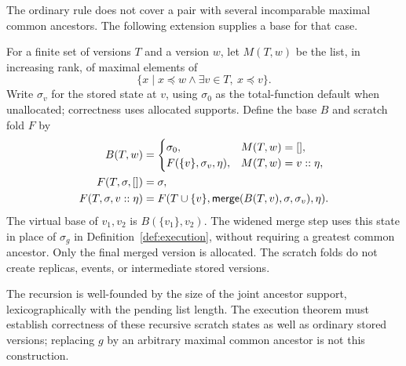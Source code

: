The ordinary rule does not cover a pair with several incomparable maximal
common ancestors. The following extension supplies a base for that case.

\begin{definition}
\label{def:virtual}
For a finite set of versions $T$ and a version $w$, let $M(T,w)$ be the list,
in increasing rank, of maximal elements of
\[
 \{x\mid x\preceq w\land\exists v\in T,\ x\preceq v\}.
\]
Write $\sigma_v$ for the stored state at $v$, using $\sigma_0$ as the total-function
default when unallocated; correctness uses allocated supports. Define the
base $B$ and scratch fold $F$ by
\begin{align*}
 B(T,w)&=
 \begin{cases}
 \sigma_0,&M(T,w)=[],\\
 F(\{v\},\sigma_v,\eta),&M(T,w)=v::\eta,
 \end{cases}\\
 F(T,\sigma,[])&=\sigma,\\
 F(T,\sigma,v::\eta)&=F(T\cup\{v\},\mathsf{merge}(B(T,v),\sigma,\sigma_v),\eta).
\end{align*}
The virtual base of $v_1,v_2$ is $B(\{v_1\},v_2)$.
The widened merge step uses this state in place of $\sigma_g$ in
Definition~\ref{def:execution}, without requiring a greatest common ancestor.
Only the final merged version is allocated. The scratch folds do not create
replicas, events, or intermediate stored versions.
\end{definition}
The recursion is well-founded by the size of the joint ancestor support,
lexicographically with the pending list length. The execution theorem must
establish correctness of these recursive scratch states as well as ordinary
stored versions; replacing $g$ by an arbitrary maximal common ancestor is not
this construction.
